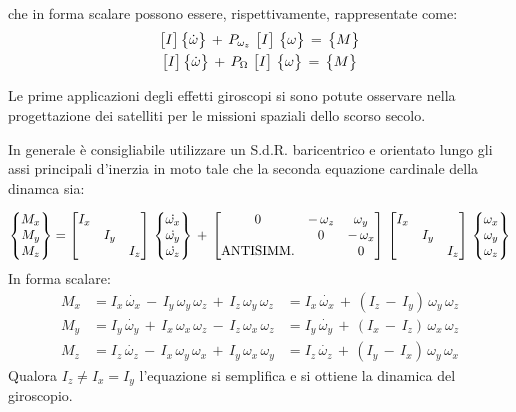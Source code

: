	che in forma scalare possono essere, rispettivamente, rappresentate come:
	\begin{gather*}
			 \begin{bmatrix}I\end{bmatrix} \begin{Bmatrix}\dot{\omega}\end{Bmatrix}\,+\,P_{\omega_z}\,\begin{bmatrix}I\end{bmatrix}\,\begin{Bmatrix}\omega\end{Bmatrix}\,=\,\begin{Bmatrix}M\end{Bmatrix}\\
			 \begin{bmatrix}I\end{bmatrix} \begin{Bmatrix}\dot{\omega}\end{Bmatrix}\,+\,P_{\Omega}\, \begin{bmatrix}I\end{bmatrix}\,\begin{Bmatrix}\omega\end{Bmatrix}\,=\,\begin{Bmatrix}M\end{Bmatrix}
	\end{gather*}
	
	Le prime applicazioni degli effetti giroscopi si sono potute osservare nella progettazione dei satelliti per le missioni spaziali dello scorso secolo.
	
	In generale è consigliabile utilizzare un S.d.R. baricentrico e orientato lungo gli assi principali d'inerzia in moto tale che la seconda equazione cardinale della dinamca sia:	
	
	\[
	\begin{Bmatrix}M_x\\M_y\\M_z\end{Bmatrix} = \begin{bmatrix}I_x&&\\&I_y&\\&&I_z\end{bmatrix}\,\begin{Bmatrix}\dot{\omega_x}\\\dot{\omega_y}\\\dot{\omega_z}\end{Bmatrix}\,+\,
    \begin{bmatrix}0 & -\,\omega_z & \omega_y\\
      & 0 & -\,\omega_x \\
      \text{ANTISIMM.}& & 0\end{bmatrix}\,
      \begin{bmatrix}I_x&&\\&I_y&\\&&I_z\end{bmatrix}\,\begin{Bmatrix}\omega_x\\\omega_y\\\omega_z\end{Bmatrix}    
	\]
	In forma scalare:
	\begin{align*}
	M_x &= I_x\,\dot{\omega_x}\,-\,I_y\,\omega_y\,\omega_z\,+\,I_z\,\omega_y\,\omega_z &= I_x\,\dot{\omega_x}\,+\,(I_z\,-\,I_y)\,\omega_y\,\omega_z\\
	M_y &= I_y\,\dot{\omega_y}\,+\,I_x\,\omega_x\,\omega_z\,-\,I_z\,\omega_x\,\omega_z &= I_y\,\dot{\omega_y}\,+\,(I_x\,-\,I_z)\,\omega_x\,\omega_z\\
	M_z &= I_z\,\dot{\omega_z}\,-\,I_x\,\omega_y\,\omega_x\,+\,I_y\,\omega_x\,\omega_y &= I_z\,\dot{\omega_z}\,+\,(I_y\,-\,I_x)\,\omega_y\,\omega_x
	\end{align*}
	Qualora $I_z\ne I_x = I_y$ l'equazione si semplifica e si ottiene la dinamica del giroscopio.
	\vspace{1mm}
	
